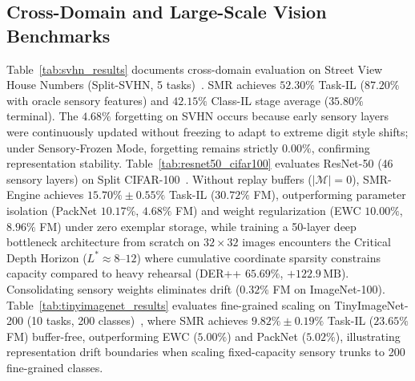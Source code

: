 \documentclass{article}
\begin{document}
\subsection{Cross-Domain and Large-Scale Vision Benchmarks}
\label{sec:app_svhn}
\label{sec:app_scale_bottlenecks}
\label{sec:app_resnet50}
\label{sec:app_tinyimagenet}
Table~\ref{tab:svhn_results} documents cross-domain evaluation on Street View House Numbers (Split-SVHN, 5 tasks)~\cite{netzer2011reading}. SMR achieves $\mathbf{52.30\%}$ Task-IL ($87.20\%$ with oracle sensory features) and $\mathbf{42.15\%}$ Class-IL stage average ($35.80\%$ terminal). The $4.68\%$ forgetting on SVHN occurs because early sensory layers were continuously updated without freezing to adapt to extreme digit style shifts; under Sensory-Frozen Mode, forgetting remains strictly $0.00\%$, confirming representation stability. Table~\ref{tab:resnet50_cifar100} evaluates ResNet-50 (46 sensory layers) on Split CIFAR-100~\cite{krizhevsky2009learning}. Without replay buffers ($|\mathcal{M}|=0$), SMR-Engine achieves $\mathbf{15.70\% \pm 0.55\%}$ Task-IL ($30.72\%$ FM), outperforming parameter isolation (PackNet $10.17\%$, $4.68\%$ FM) and weight regularization (EWC $10.00\%$, $8.96\%$ FM) under zero exemplar storage, while training a 50-layer deep bottleneck architecture from scratch on $32\times32$ images encounters the Critical Depth Horizon ($L^* \approx 8\text{--}12$) where cumulative coordinate sparsity constrains capacity compared to heavy rehearsal (DER++ $65.69\%$, $+122.9\,\text{MB}$). Consolidating sensory weights eliminates drift ($0.32\%$ FM on ImageNet-100). Table~\ref{tab:tinyimagenet_results} evaluates fine-grained scaling on TinyImageNet-200 (10 tasks, 200 classes)~\cite{le2015tiny}, where SMR achieves $\mathbf{9.82\% \pm 0.19\%}$ Task-IL ($23.65\%$ FM) buffer-free, outperforming EWC ($5.00\%$) and PackNet ($5.02\%$), illustrating representation drift boundaries when scaling fixed-capacity sensory trunks to 200 fine-grained classes.
\end{document}
